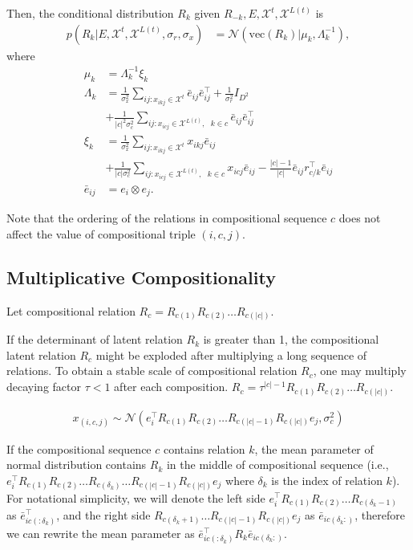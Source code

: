 Then, the conditional distribution $R_k$ given $R_{-k}, E, \mathcal{X}^{t}, \mathcal{X}^{L(t)}$ is
\begin{align}
\label{eqn:comp_cond_r}
p(R_k|E, \mathcal{X}^{t}, \mathcal{X}^{L(t)}, \sigma_r, \sigma_x)  &= \mathcal{N}(\text{vec}(R_k) | \mu_k, \Lambda_k^{-1}),
\end{align}
where
\begin{align*}
\mu_k &=\Lambda_k^{-1}\xi_k \\
\Lambda_k &= \frac{1}{\sigma_x^2} \sum_{ij:x_{ikj} \in \mathcal{X}^{t}} \bar{e}_{ij}\bar{e}_{ij}^\top + \frac{1}{\sigma_r^2} {I}_{D^2} \\
& +\frac{1}{|c|^2 \sigma_c^2} \sum_{ij:x_{icj} \in \mathcal{X}^{L(t)},\text{ }k \in c} \bar{e}_{ij} \bar{e}_{ij}^\top \\
\xi_k &=  \frac{1}{\sigma_x^2}\sum_{ij:x_{ikj} \in \mathcal{X}^{t}} x_{ikj} \bar{e}_{ij}\\
& +\frac{1}{|c| \sigma_c^2} \sum_{ij:x_{icj} \in \mathcal{X}^{L(t)},\text{ }k \in c} x_{icj} \bar{e}_{ij} - \frac{|c|-1}{|c|} \bar{e}_{ij} r_{c/k}^\top \bar{e}_{ij}\\
\bar{e}_{ij} &= e_{i} \otimes e_{j}.
\end{align*}

Note that the ordering of the relations in compositional sequence $c$ does not affect the value of compositional triple $(i, c, j)$.

\subsection{Multiplicative Compositionality}
Let compositional relation $R_c = R_{c(1)} R_{c(2)} \dots R_{c(|c|)}$.

If the determinant of latent relation $R_k$ is greater than 1, the compositional latent relation $R_c$ might be exploded after multiplying a long sequence of relations. To obtain a stable scale of compositional relation $R_c$, one may multiply decaying factor $\tau < 1$ after each composition. $R_c = \tau^{|c|-1} R_{c(1)} R_{c(2)} \dots R_{c(|c|)}$.

\begin{align}
x_{(i, c, j)} \sim \mathcal{N}(e_i^\top R_{c(1)}R_{c(2)} \dots R_{c(|c|-1)}R_{c(|c|)} e_j, \sigma_{c}^2)
\end{align}

If the compositional sequence $c$ contains relation $k$, the mean parameter of normal distribution contains $R_k$ in the middle of compositional sequence (i.e., $e_i^\top R_{c(1)}R_{c(2)} \dots R_{c(\delta_k)} \dots R_{c(|c|-1)}R_{c(|c|)} e_j$ where $\delta_k$ is the index of relation $k$). For notational simplicity, we will denote the left side $e_i^\top R_{c(1)}R_{c(2)} \dots R_{c(\delta_k -1)}$ as $\bar{e}_{ic(:\delta_k)}^\top$, and the right side $R_{c(\delta_k + 1)} \dots R_{c(|c|-1)}R_{c(|c|)} e_j$ as $\bar{e}_{ic(\delta_k:)}$, therefore we can rewrite the mean parameter as $\bar{e}_{ic(:\delta_k)}^\top R_{k} \bar{e}_{ic(\delta_k:)}$.

